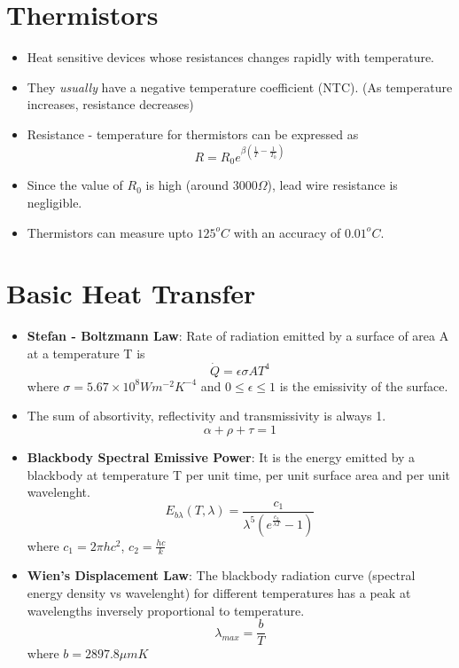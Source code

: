 \documentclass{article}
\begin{document}
\section{Thermistors}
	\begin{itemize}
		\item Heat sensitive devices whose resistances changes rapidly with temperature. 
		\item They \textit{usually} have a negative temperature coefficient (NTC). (As temperature increases, resistance decreases) 
		\item Resistance - temperature for thermistors can be expressed as
		\[R = R_0 e^{\beta(\frac{1}{T}-\frac{1}{T_0})}\]
		\item Since the value of $R_0$ is high (around $3000\Omega$), lead wire resistance is negligible.
		\item Thermistors can measure upto $125^{o}C$ with an accuracy of $0.01^{o}C$. 
	\end{itemize}

\section{Basic Heat Transfer}
	\begin{itemize}
		\item \textbf{Stefan - Boltzmann Law}: Rate of radiation emitted by a surface of area A at a temperature T is 
		\[\dot{Q} = \epsilon \sigma A T^4\]
		where $\sigma = 5.67 \times 10^8 Wm^{-2}K^{-4}$ and $ 0 \leq \epsilon\leq 1$ is the emissivity of the surface.
		\item The sum of absortivity, reflectivity and transmissivity is always 1.
		\[\alpha + \rho + \tau =1\]
		\item \textbf{Blackbody Spectral Emissive Power}: It is the energy emitted by a blackbody at temperature T per unit time, per unit surface area  and per unit wavelenght. 
		\[E_{b\lambda}(T, \lambda) = \frac{c_1}{\lambda^5 (e^{\frac{c_2}{\lambda T}}-1)} \] 
		where $c_1 = 2\pi h c^2$, $c_2 = \frac{hc}{k}$
		\item \textbf{Wien's Displacement Law}: The blackbody radiation curve (spectral energy density vs wavelenght) for different temperatures has a peak at wavelengths inversely proportional to temperature. 
		\[\lambda_{max} = \frac{b}{T}\]
		where $b= 2897.8 \mu mK$
	\end{itemize}
\end{document}
